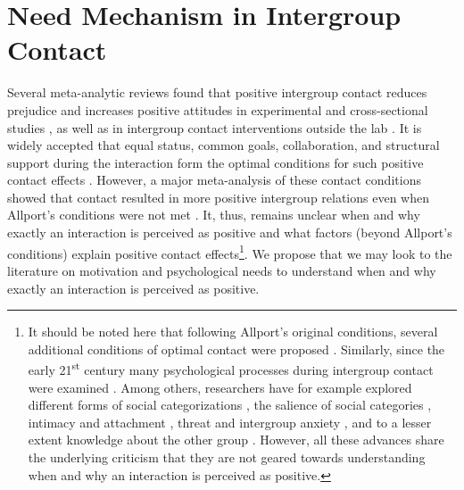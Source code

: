 \documentclass[man, 12pt, a4paper]{apa7}
\theoremstyle{break}
\theoremstyle{plain}
\begin{document}
\section{Need Mechanism in Intergroup Contact}
Several meta-analytic reviews found that positive intergroup contact reduces prejudice and increases positive attitudes in experimental and cross-sectional studies \citep[][]{Tropp2005, Pettigrew2006, Davies2011}, as well as in intergroup contact interventions outside the lab \citep[][]{Beelmann2014, Lemmer2015}. It is widely accepted that equal status, common goals, collaboration, and structural support during the interaction form the optimal conditions for such positive contact effects \citep[Allport's Optimal Contact conditions;][]{Allport1954b, Pettigrew1969}. However, a major meta-analysis of these contact conditions showed that contact resulted in more positive intergroup relations even when Allport's conditions were not met \citep[][]{Pettigrew2006}. It, thus, remains unclear when and why exactly an interaction is perceived as positive and what factors (beyond Allport's conditions) explain positive contact effects\footnote{It should be noted here that following Allport's original conditions, several additional conditions of optimal contact were proposed \citep[for a critical discussion see][]{Pettigrew1986}. Similarly, since the early 21\textsuperscript{st} century many psychological processes during intergroup contact were examined \citep[e.g. see,][]{Paolini2021}. Among others, researchers have for example explored different forms of social categorizations \citep[][]{Pettigrew1998}, the salience of social categories \citep[][]{Brown2005}, intimacy \citep[e.g.,][]{Marinucci2021} and attachment \citep[e.g.,][]{Tropp2021}, threat and intergroup anxiety \citep[e.g.,][]{Stephan2008, Paolini2004}, and to a lesser extent knowledge about the other group \citep[][]{Pettigrew2008c}. However, all these advances share the underlying criticism that they are not geared towards understanding when and why an interaction is perceived as positive.}. We propose that we may look to the literature on motivation and psychological needs to understand when and why exactly an interaction is perceived as positive.
\end{document}
